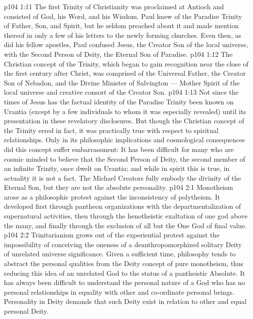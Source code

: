 \vs p104 1:11 The first Trinity of Christianity was proclaimed at Antioch and consisted of God, his Word, and his Wisdom. Paul knew of the Paradise Trinity of Father, Son, and Spirit, but he seldom preached about it and made mention thereof in only a few of his letters to the newly forming churches. Even then, as did his fellow apostles, Paul confused Jesus, the Creator Son of the local universe, with the Second Person of Deity, the Eternal Son of Paradise.
\vs p104 1:12 The Christian concept of the Trinity, which began to gain recognition near the close of the first century after Christ, was comprised of the Universal Father, the Creator Son of Nebadon, and the Divine Minister of Salvington --- Mother Spirit of the local universe and creative consort of the Creator Son.
\vs p104 1:13 Not since the times of Jesus has the factual identity of the Paradise Trinity been known on Urantia (except by a few individuals to whom it was especially revealed) until its presentation in these revelatory disclosures. But though the Christian concept of the Trinity erred in fact, it was practically true with respect to spiritual relationships. Only in its philosophic implications and cosmological consequences did this concept suffer embarrassment: It has been difficult for many who are cosmic minded to believe that the Second Person of Deity, the second member of an infinite Trinity, once dwelt on Urantia; and while in spirit this is true, in actuality it is not a fact. The Michael Creators fully embody the divinity of the Eternal Son, but they are not the absolute personality.
\vs p104 2:1 Monotheism arose as a philosophic protest against the inconsistency of polytheism. It developed first through pantheon organizations with the departmentalization of supernatural activities, then through the henotheistic exaltation of one god above the many, and finally through the exclusion of all but the One God of final value.
\vs p104 2:2 Trinitarianism grows out of the experiential protest against the impossibility of conceiving the oneness of a deanthropomorphized solitary Deity of unrelated universe significance. Given a sufficient time, philosophy tends to abstract the personal qualities from the Deity concept of pure monotheism, thus reducing this idea of an unrelated God to the status of a pantheistic Absolute. It has always been difficult to understand the personal nature of a God who has no personal relationships in equality with other and co\hyp{}ordinate personal beings. Personality in Deity demands that such Deity exist in relation to other and equal personal Deity.
